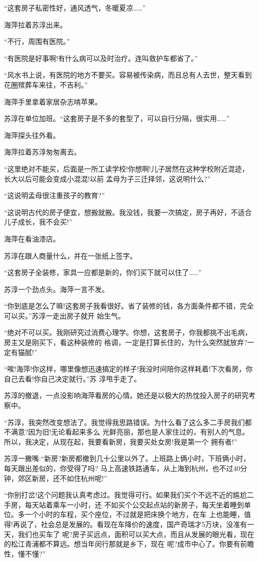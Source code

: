 \documentclass[11pt,a4paper,onecolumn]{article}
\begin{document}
``这套房子私密性好，通风透气，冬暖夏凉……''

海萍拉着苏淳出来。

``不行，周围有医院。''

``有医院是好事啊!有什么病可以及时治疗。连叫救护车都省了。''

``风水书上说，有医院的地方不要买。容易被传染病，而且总有人去世，整天看到花圈殡葬车来往，不吉利。''

海萍手里拿着家居杂志啃苹果。

苏淳在单位加班。``这套房子是不多的套型了，可以自行分隔，很实用……''

海萍探头往外看。

海萍拉着苏淳匆匆离去。

``这里绝对不能买，后面是一所工读学校!你想啊!儿子居然在这种学校附近混迹，长大以后可能会变成小混混!以前
孟母为子三迁择邻，这说明什么?''

``这说明孟母很注重孩子的教育?''

``这说明古代的房子便宜，想搬就搬。我没钱，我要一次搞定，房子再好，不适合儿子成长，我不会买!''

海萍在看油漆店。

苏淳在跟人商量什么，并在一张纸上签字。

``这套房子全装修，家具一应都是新的，你们买下就可以住了……''

苏淳一个劲点头。海萍一言不发。

``你到底是怎么了嘛!这套房子我看很好。省了装修的钱，各方面条件都不错，完全可以买。''苏淳一走出房子就开
始生气。

``绝对不可以买。我刚研究过消费心理学。你想，这套房子，你我都挑不出毛病，房主又是刚买下，看这种装修的
格调，一定是打算长住的，为什么突然就放弃?一定有猫腻!''

``唉!海萍!你这样，哪里像想迅速搞定的样子!我没时间陪你这样耗着!下次看房，你自己去看!你自己决定就行。''苏
淳甩手走了。

苏淳的撤退，一点没影响海萍看房的心情。她还是以极大的热忱投入房子的研究考察中。

``苏淳，我突然改变想法了。我觉得我思路错误。为什么看了这么多二手房我们都不满意?因为旧!无论看起来多么
光鲜亮丽，那也是人家住过的，有别人的气息。所以，我决定，从现在起，我要看新房，我要买处女房!我是第一个
拥有者!''

苏淳一撇嘴:``新房?新房都撤到几十公里以外了。上班路上俩小时，下班俩小时，每天跟出差似的，你受得了吗?
马上高速铁路通车，从上海到杭州，也不过40分钟，郊区新房，还不如住杭州呢!''

``你别打岔!这个问题我认真考虑过。我觉得可行。如果我们买个不远不近的尴尬二手房，每天站着乘车一小时，还
不如买个公交起点站的新房子，每天坐着睡到单位。多一个小时的车程，买个座位，不过就是把床换个地方，在车
上也能睡，值得!再说了，社会总是发展的。看现在车降价的速度，国产奇瑞才5万块，没准有一天，我们也买车了
呢?房子买远点，面积可以买大点，而且从发展的眼光看，现在的松江青浦都不算远。想当年闵行那就是乡下，现在
呢?成市中心了。你要有前瞻性，懂不懂?''
\end{document}
